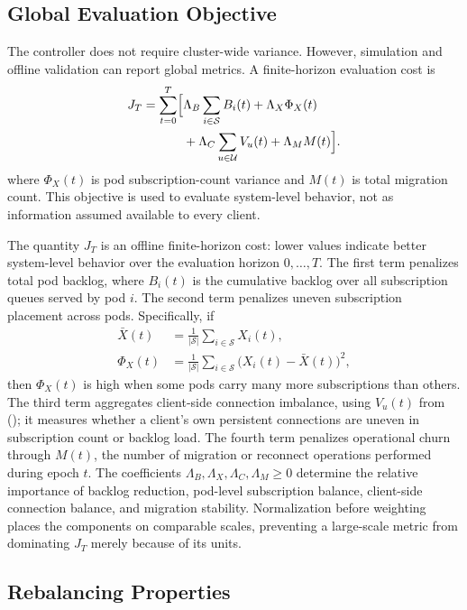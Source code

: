 \subsection{Global Evaluation Objective}

The controller does not require cluster-wide variance. However, simulation and
offline validation can report global metrics. A finite-horizon evaluation cost
is
\begin{align}
	J_T =
	\sum_{t=0}^{T}
	\Bigl[
	&\Lambda_B \sum_{i\in\mathcal{S}}B_i(t)
	+\Lambda_X \Phi_X(t) \nonumber\\
	&+\Lambda_C \sum_{u\in\mathcal{U}}V_u(t)
	+\Lambda_M M(t)
	\Bigr].
\end{align}
where $\Phi_X(t)$ is pod subscription-count variance and $M(t)$ is total
migration count. This objective is used to evaluate system-level behavior, not
as information assumed available to every client.

The quantity $J_T$ is an offline finite-horizon cost: lower values indicate
better system-level behavior over the evaluation horizon $0,\ldots,T$. The
first term penalizes total pod backlog, where $B_i(t)$ is the cumulative
backlog over all subscription queues served by pod $i$. The second term
penalizes uneven subscription placement across pods. Specifically, if
\begin{align*}
	\bar{X}(t)
	&=\frac{1}{|\mathcal{S}|}\sum_{i\in\mathcal{S}}X_i(t),\\
	\Phi_X(t)
	&=\frac{1}{|\mathcal{S}|}
	\sum_{i\in\mathcal{S}}\bigl(X_i(t)-\bar{X}(t)\bigr)^2,
\end{align*}
then $\Phi_X(t)$ is high when some pods carry many more subscriptions than
others. The third term aggregates client-side connection imbalance, using
$V_u(t)$ from (); it measures whether a
client's own persistent connections are uneven in subscription count or
backlog load. The fourth term penalizes operational churn through $M(t)$, the
number of migration or reconnect operations performed during epoch $t$.
The coefficients
$\Lambda_B,\Lambda_X,\Lambda_C,\Lambda_M\geq 0$ determine the relative
importance of backlog reduction, pod-level subscription balance, client-side
connection balance, and migration stability. Normalization before weighting
places the components on comparable scales, preventing a large-scale metric
from dominating $J_T$ merely because of its units.

\subsection{Rebalancing Properties}

